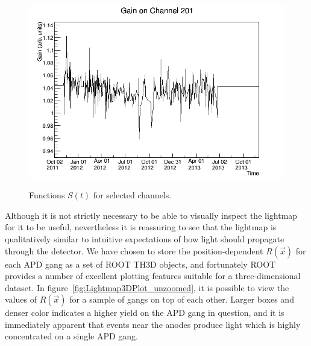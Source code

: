 \begin{figure}
\begin{center}
\includegraphics[keepaspectratio=true,width=\textwidth]{gainfunc_201.png}
\end{center}
\renewcommand{\baselinestretch}{1}
\small\normalsize
\begin{quote}
\caption{Functions $S(t)$ for selected channels.}
\label{fig:LightmapGainFunc3}
\end{quote}
\end{figure}
\renewcommand{\baselinestretch}{2}
\small\normalsize

Although it is not strictly necessary to be able to visually inspect the lightmap for it to be useful, nevertheless it is reassuring to see that the lightmap is qualitatively similar to intuitive expectations of how light should propagate through the detector.  We have chosen to store the position-dependent $R(\vec{x})$ for each APD gang as a set of ROOT TH3D objects, and fortunately ROOT provides a number of excellent plotting features suitable for a three-dimensional dataset.  In figure~\ref{fig:Lightmap3DPlot_unzoomed}, it is possible to view the values of $R(\vec{x})$ for a sample of gangs on top of each other.  Larger boxes and denser color indicates a higher yield on the APD gang in question, and it is immediately apparent that events near the anodes produce light which is highly concentrated on a single APD gang.

